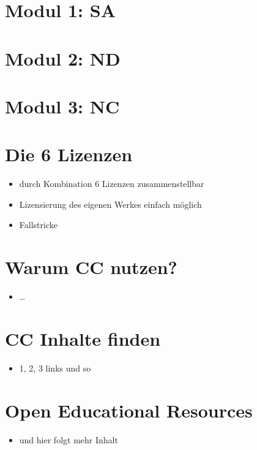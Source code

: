 \documentclass[14pt,handout]{beamer}
\begin{document}
\section{Modul 1: SA}
\section{Modul 2: ND}
\section{Modul 3: NC}
\section{Die 6 Lizenzen}
\begin{itemize}
    \item durch Kombination 6 Lizenzen zusammenstellbar
    \item Lizensierung des eigenen Werkes einfach möglich
    \item Fallstricke
\end{itemize}
\section{Warum CC nutzen?}
\begin{itemize}
    \item \ldots
\end{itemize}
\section{CC Inhalte finden}
\begin{itemize}
    \item 1, 2, 3 links und so
\end{itemize}
\section{Open Educational Resources}
\begin{itemize}
    \item und hier folgt mehr Inhalt
\end{itemize}
\end{document}
